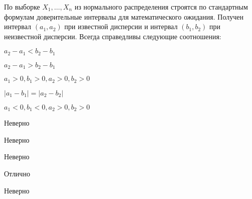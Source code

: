 
\begin{question}
По выборке \(X_1,\ldots, X_n\) из нормального распределения строятся по
стандартным формулам доверительные интервалы для математического
ожидания. Получен интервал \((a_1,a_2)\) при известной дисперсии и
интервал \((b_1,b_2)\) при неизвестной дисперсии. Всегда справедливы
следующие соотношения:
\begin{answerlist}
  \item \(a_2 - a_1 < b_2 - b_1\)
  \item \(a_2 - a_1 > b_2 - b_1\)
  \item \(a_1>0,b_1>0,a_2>0,b_2>0\)
  \item \(|a_1-b_1| = |a_2-b_2|\)
  \item \(a_1<0,b_1<0,a_2>0,b_2>0\)
\end{answerlist}
\end{question}

\begin{solution}
\begin{answerlist}
  \item Неверно
  \item Неверно
  \item Неверно
  \item Отлично
  \item Неверно
\end{answerlist}
\end{solution}

